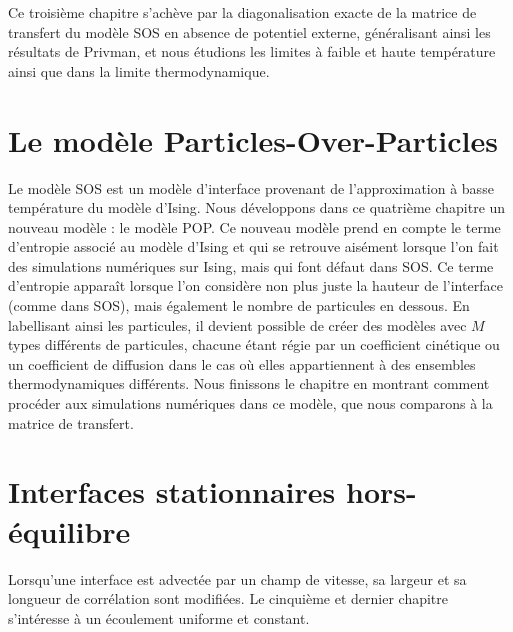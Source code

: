 Ce troisième chapitre s'achève par la diagonalisation exacte de la matrice de transfert du modèle SOS en absence de potentiel externe, généralisant ainsi les résultats de Privman, et nous étudions les limites à faible et haute température ainsi que dans la limite thermodynamique.

\section*{Le modèle Particles-Over-Particles}

Le modèle SOS est un modèle d'interface provenant de l'approximation à basse température du modèle d'Ising. Nous développons dans ce quatrième chapitre un nouveau modèle : le modèle POP. Ce nouveau modèle prend en compte le terme d'entropie associé au modèle d'Ising et qui se retrouve aisément lorsque l'on fait des simulations numériques sur Ising, mais qui font défaut dans SOS. Ce terme d'entropie apparaît lorsque l'on considère non plus juste la hauteur de l'interface (comme dans SOS), mais également le nombre de particules en dessous. En labellisant ainsi les particules, il devient possible de créer des modèles avec $M$ types différents de particules, chacune étant régie par un coefficient cinétique ou un coefficient de diffusion dans le cas où elles appartiennent à des ensembles thermodynamiques différents. Nous finissons le chapitre en montrant comment procéder aux simulations numériques dans ce modèle, que nous comparons à la matrice de transfert. 

\section*{Interfaces stationnaires hors-équilibre} 

Lorsqu'une interface est advectée par un champ de vitesse, sa largeur et sa longueur de corrélation sont modifiées. Le cinquième et dernier chapitre s'intéresse à un écoulement uniforme et constant. 

